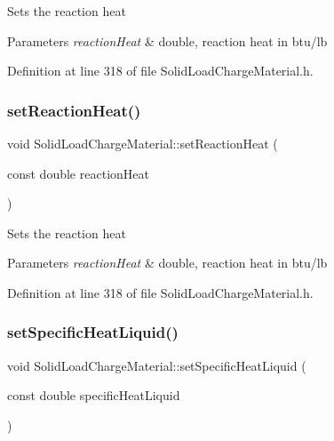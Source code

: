 Sets the reaction heat 
\begin{DoxyParams}{Parameters}
{\em reaction\+Heat} & double, reaction heat in btu/lb \\
\hline
\end{DoxyParams}


Definition at line 318 of file Solid\+Load\+Charge\+Material.\+h.

\mbox{\label{class_solid_load_charge_material_a9c3cd28b2b31fb66eea984d9030cd247}} 
\subsubsection{\texorpdfstring{set\+Reaction\+Heat()}{setReactionHeat()}\hspace{0.1cm}{\footnotesize\ttfamily [3/3]}}
{\footnotesize\ttfamily void Solid\+Load\+Charge\+Material\+::set\+Reaction\+Heat (\begin{DoxyParamCaption}\item[{const double}]{reaction\+Heat }\end{DoxyParamCaption})\hspace{0.3cm}{\ttfamily [inline]}}

Sets the reaction heat 
\begin{DoxyParams}{Parameters}
{\em reaction\+Heat} & double, reaction heat in btu/lb \\
\hline
\end{DoxyParams}


Definition at line 318 of file Solid\+Load\+Charge\+Material.\+h.

\mbox{\label{class_solid_load_charge_material_a91fad347bf52a4f6695c304904091797}} 
\subsubsection{\texorpdfstring{set\+Specific\+Heat\+Liquid()}{setSpecificHeatLiquid()}\hspace{0.1cm}{\footnotesize\ttfamily [1/3]}}
{\footnotesize\ttfamily void Solid\+Load\+Charge\+Material\+::set\+Specific\+Heat\+Liquid (\begin{DoxyParamCaption}\item[{const double}]{specific\+Heat\+Liquid }\end{DoxyParamCaption})\hspace{0.3cm}{\ttfamily [inline]}}

